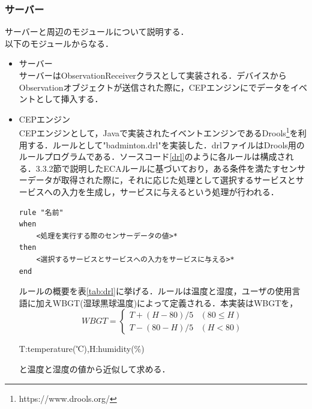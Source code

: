 \documentclass{kuisthesis}			%
\begin{document}
\subsubsection{サーバー}
サーバーと周辺のモジュールについて説明する．\\
以下のモジュールからなる．\\
\begin{itemize}
\item サーバー\\
サーバーはObservationReceiverクラスとして実装される．デバイスからObservationオブジェクトが送信された際に，CEPエンジンにでデータをイベントとして挿入する．
\item CEPエンジン\\
CEPエンジンとして，Javaで実装されたイベントエンジンであるDrools\footnote{https://www.drools.org/}を利用する．ルールとして"badminton.drl"を実装した．drlファイルはDrools用のルールプログラムである．ソースコード\ref{drl}のように各ルールは構成される．3.3.2節で説明したECAルールに基づいており，ある条件を満たすセンサーデータが取得された際に，それに応じた処理として選択するサービスとサービスへの入力を生成し，サービスに与えるという処理が行われる．

\begin{lstlisting}[caption=drlファイル仕様,label=drl]
rule "名前"
when
    <処理を実行する際のセンサーデータの値>*
then
    <選択するサービスとサービスへの入力をサービスに与える>*
end
\end{lstlisting}



ルールの概要を表\ref{tab:drl}に挙げる．ルールは温度と湿度，ユーザの使用言語に加えWBGT(湿球黒球温度)によって定義される．本実装はWBGTを，
\begin{equation}
WBGT = \begin{cases}
T + (H - 80)/5 & (80 \leq H) \\
T -(80 -H)/5 & (H < 80)
\end{cases}
\end{equation}
\begin{flushright}
T:temperature(℃),H:humidity(\%)
\end{flushright}
と温度と湿度の値から近似して求める．


\end{itemize}
\end{document}
